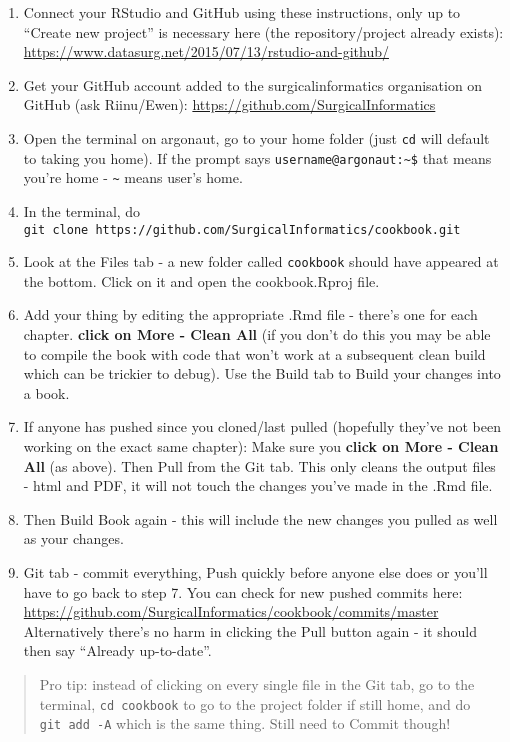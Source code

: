 \documentclass[]{book}
\begin{document}
\begin{enumerate}
\def\labelenumi{\arabic{enumi}.}
\item
  Connect your RStudio and GitHub using these instructions, only up to ``Create new project'' is necessary here (the repository/project already exists):
  \url{https://www.datasurg.net/2015/07/13/rstudio-and-github/}
\item
  Get your GitHub account added to the surgicalinformatics organisation on GitHub (ask Riinu/Ewen):
  \url{https://github.com/SurgicalInformatics}
\item
  Open the terminal on argonaut, go to your home folder (just \texttt{cd} will default to taking you home). If the prompt says \texttt{username@argonaut:\textasciitilde{}\$} that means you're home - \texttt{\textasciitilde{}} means user's home.
\item
  In the terminal, do \texttt{git\ clone\ https://github.com/SurgicalInformatics/cookbook.git}
\item
  Look at the Files tab - a new folder called \texttt{cookbook} should have appeared at the bottom. Click on it and open the cookbook.Rproj file.
\item
  Add your thing by editing the appropriate .Rmd file - there's one for each chapter. \textbf{click on More - Clean All} (if you don't do this you may be able to compile the book with code that won't work at a subsequent clean build which can be trickier to debug). Use the Build tab to Build your changes into a book.
\item
  If anyone has pushed since you cloned/last pulled (hopefully they've not been working on the exact same chapter): Make sure you \textbf{click on More - Clean All} (as above). Then Pull from the Git tab. This only cleans the output files - html and PDF, it will not touch the changes you've made in the .Rmd file.
\item
  Then Build Book again - this will include the new changes you pulled as well as your changes.
\item
  Git tab - commit everything, Push quickly before anyone else does or you'll have to go back to step 7. You can check for new pushed commits here: \url{https://github.com/SurgicalInformatics/cookbook/commits/master} Alternatively there's no harm in clicking the Pull button again - it should then say ``Already up-to-date''.
\end{enumerate}

\begin{quote}
Pro tip: instead of clicking on every single file in the Git tab, go to the terminal, \texttt{cd\ cookbook} to go to the project folder if still home, and do \texttt{git\ add\ -A} which is the same thing. Still need to Commit though!
\end{quote}
\end{document}
